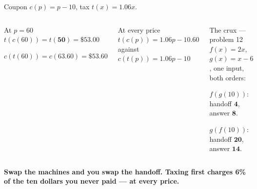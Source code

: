 \documentclass[aspectratio=169, 11pt]{beamer}
\begin{document}
\begin{frame}[t, plain]

  Coupon \(c(p) = p - 10\), \qquad tax \(t(x) = 1.06x\).

  \medskip
  \begin{columns}[T, onlytextwidth]
      \begin{block}{At \(p = 60\)}
        \(t(c(60)) = t(\mathbf{50}) = \$53.00\)

        \smallskip
        \(c(t(60)) = c(\mathbf{63.60}) = \$53.60\)
      \end{block}

      \smallskip
      \begin{block}{At every price}
        \(t(c(p)) = 1.06p - 10.60\) \quad against \quad \(c(t(p)) = 1.06p - 10\)
      \end{block}

      \begin{block}{The crux --- problem 12}
        \(f(x) = 2x\), \(g(x) = x - 6\), one input, both orders:

        \smallskip
        \(f(g(10))\): handoff \(\mathbf{4}\), answer \(\mathbf{8}\).

        \smallskip
        \(g(f(10))\): handoff \(\mathbf{20}\), answer \(\mathbf{14}\).
      \end{block}
  \end{columns}

  \bigskip
  \begin{center}
    \textbf{Swap the machines and you swap the handoff. Taxing first charges 6\% of the ten
    dollars you never paid --- at every price.}
  \end{center}
\end{frame}
\end{document}
